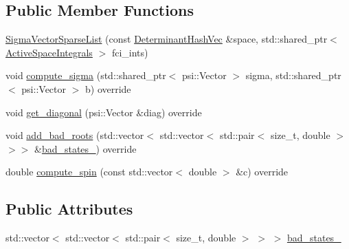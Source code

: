 \subsection*{Public Member Functions}
\begin{DoxyCompactItemize}
\item 
\mbox{\hyperlink{classforte_1_1_sigma_vector_sparse_list_a725dd8c7ac42cd22d445fc17025acb44}{Sigma\+Vector\+Sparse\+List}} (const \mbox{\hyperlink{classforte_1_1_determinant_hash_vec}{Determinant\+Hash\+Vec}} \&space, std\+::shared\+\_\+ptr$<$ \mbox{\hyperlink{classforte_1_1_active_space_integrals}{Active\+Space\+Integrals}} $>$ fci\+\_\+ints)
\item 
void \mbox{\hyperlink{classforte_1_1_sigma_vector_sparse_list_a5f5e4c5457fd9b0511e7c42824dde927}{compute\+\_\+sigma}} (std\+::shared\+\_\+ptr$<$ psi\+::\+Vector $>$ sigma, std\+::shared\+\_\+ptr$<$ psi\+::\+Vector $>$ b) override
\item 
void \mbox{\hyperlink{classforte_1_1_sigma_vector_sparse_list_a63742825b87a60b9ed9a175372b34fb1}{get\+\_\+diagonal}} (psi\+::\+Vector \&diag) override
\item 
void \mbox{\hyperlink{classforte_1_1_sigma_vector_sparse_list_a1fa83f96983a54077f5982befce39858}{add\+\_\+bad\+\_\+roots}} (std\+::vector$<$ std\+::vector$<$ std\+::pair$<$ size\+\_\+t, double $>$$>$$>$ \&\mbox{\hyperlink{classforte_1_1_sigma_vector_sparse_list_ac92bafbe93d7956166ed0d5d3469521f}{bad\+\_\+states\+\_\+}}) override
\item 
double \mbox{\hyperlink{classforte_1_1_sigma_vector_sparse_list_a9302fb3daf4ec14c3bca274c9757f9f3}{compute\+\_\+spin}} (const std\+::vector$<$ double $>$ \&c) override
\end{DoxyCompactItemize}
\subsection*{Public Attributes}
\begin{DoxyCompactItemize}
\item 
std\+::vector$<$ std\+::vector$<$ std\+::pair$<$ size\+\_\+t, double $>$ $>$ $>$ \mbox{\hyperlink{classforte_1_1_sigma_vector_sparse_list_ac92bafbe93d7956166ed0d5d3469521f}{bad\+\_\+states\+\_\+}}
\end{DoxyCompactItemize}
